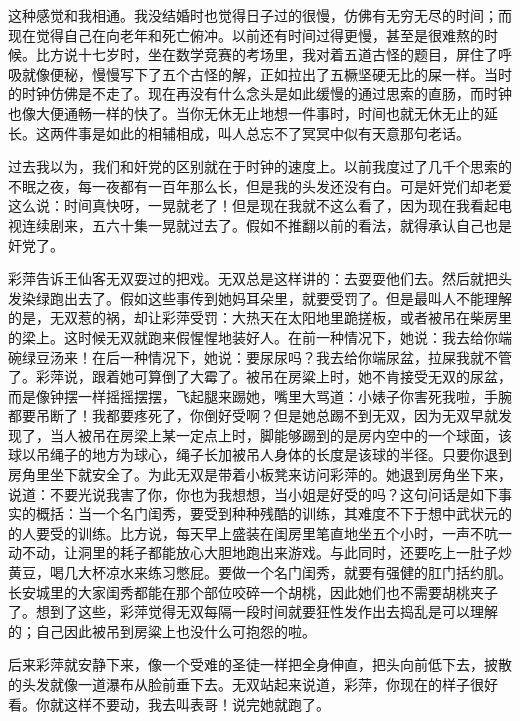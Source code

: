 这种感觉和我相通。我没结婚时也觉得日子过的很慢，仿佛有无穷无尽的时间；而现在觉得自己在向老年和死亡俯冲。以前还有时间过得更慢，甚至是很难熬的时候。比方说十七岁时，坐在数学竞赛的考场里，我对着五道古怪的题目，屏住了呼吸就像便秘，慢慢写下了五个古怪的解，正如拉出了五橛坚硬无比的屎一样。当时的时钟仿佛是不走了。现在再没有什么念头是如此缓慢的通过思索的直肠，而时钟也像大便通畅一样的快了。当你无休无止地想一件事时，时间也就无休无止的延长。这两件事是如此的相辅相成，叫人总忘不了冥冥中似有天意那句老话。 

过去我以为，我们和奸党的区别就在于时钟的速度上。以前我度过了几千个思索的不眠之夜，每一夜都有一百年那么长，但是我的头发还没有白。可是奸党们却老爱这么说：时间真快呀，一晃就老了！但是现在我就不这么看了，因为现在我看起电视连续剧来，五六十集一晃就过去了。假如不推翻以前的看法，就得承认自己也是奸党了。 

彩萍告诉王仙客无双耍过的把戏。无双总是这样讲的：去耍耍他们去。然后就把头发染绿跑出去了。假如这些事传到她妈耳朵里，就要受罚了。但是最叫人不能理解的是，无双惹的祸，却让彩萍受罚：大热天在太阳地里跪搓板，或者被吊在柴房里的梁上。这时候无双就跑来假惺惺地装好人。在前一种情况下，她说：我去给你端碗绿豆汤来！在后一种情况下，她说：要尿尿吗？我去给你端尿盆，拉屎我就不管了。彩萍说，跟着她可算倒了大霉了。被吊在房粱上时，她不肯接受无双的尿盆，而是像钟摆一样摇摇摆摆，飞起腿来踢她，嘴里大骂道：小婊子你害死我啦，手腕都要吊断了！我都要疼死了，你倒好受啊？但是她总踢不到无双，因为无双早就发现了，当人被吊在房梁上某一定点上时，脚能够踢到的是房内空中的一个球面，该球以吊绳子的地方为球心，绳子长加被吊人身体的长度是该球的半径。只要你退到房角里坐下就安全了。为此无双是带着小板凳来访问彩萍的。她退到房角坐下来，说道：不要光说我害了你，你也为我想想，当小姐是好受的吗？这句问话是如下事实的概括：当一个名门闺秀，要受到种种残酷的训练，其难度不下于想中武状元的的人要受的训练。比方说，每天早上盛装在闺房里笔直地坐五个小时，一声不吭一动不动，让洞里的耗子都能放心大胆地跑出来游戏。与此同时，还要吃上一肚子炒黄豆，喝几大杯凉水来练习憋屁。要做一个名门闺秀，就要有强健的肛门括约肌。长安城里的大家闺秀都能在那个部位咬碎一个胡桃，因此她们也不需要胡桃夹子了。想到了这些，彩萍觉得无双每隔一段时间就要狂性发作出去捣乱是可以理解的；自己因此被吊到房粱上也没什么可抱怨的啦。 

后来彩萍就安静下来，像一个受难的圣徒一样把全身伸直，把头向前低下去，披散的头发就像一道瀑布从脸前垂下去。无双站起来说道，彩萍，你现在的样子很好看。你就这样不要动，我去叫表哥！说完她就跑了。 

